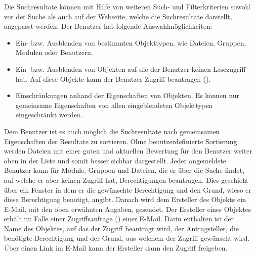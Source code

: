 Die Suchresultate können mit Hilfe von weiteren Such- und Filterkriterien sowohl vor der Suche als auch auf der Webseite, welche die Suchresultate darstellt, angepasst werden. Der Benutzer hat folgende Auswahlmöglichkeiten:
\begin{itemize}
\item Ein- bzw. Ausblenden von bestimmten Objekttypen, wie Dateien, Gruppen, Modulen oder Benutzern.
\item Ein- bzw. Ausblenden von Objekten auf die der Benutzer keinen Lesezugriff hat. Auf diese Objekte kann der Benutzer Zugriff beantragen (). 
\item Einschränkungen anhand der Eigenschaften von Objekten. Es können nur gemeinsame Eigenschaften von allen eingeblendeten Objekttypen eingeschränkt werden.
\end{itemize}
Dem Benutzer ist es auch möglich die Suchresultate nach gemeinsamen Eigenschaften der Resultate zu sortieren. Ohne benutzerdefinierte Sortierung werden Dateien mit einer guten und aktuellen Bewertung für den Benutzer weiter oben in der Liste und somit besser sichbar dargestellt.
Jeder angemeldete Benutzer kann für Module, Gruppen und Dateien, die er über die Suche findet, auf welche er aber keinen Zugriff hat, Berechtigungen beantragen. Dies geschieht über ein Fenster in dem er die gewünschte Berechtigung und den Grund, wieso er diese Berechtigung benötigt, angibt. Danach wird dem Ersteller des Objekts ein E-Mail, mit den oben erwähnten Angaben, gesendet.
Der Ersteller eines Objektes erhält im Falle einer Zugriffsanfrage () einer E-Mail. Darin enthalten ist der Name des Objektes, auf das der Zugriff beantragt wird, der Antragsteller, die benötigte Berechtigung und der Grund, aus welchem der Zugriff gewünscht wird. Über einen Link im E-Mail kann der Ersteller dann den Zugriff freigeben.

